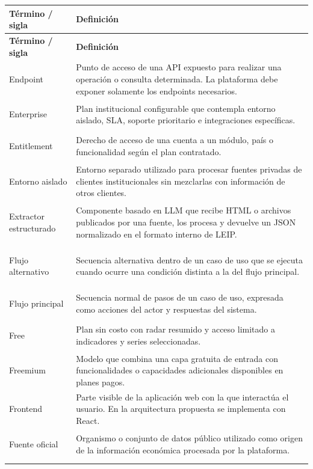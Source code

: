 \documentclass[11pt,a4paper]{article}
\makeatletter
\newcommand{\proyectoNombre}{LEIP}
\newenvironment{glosario}{%
  \renewcommand{\arraystretch}{1.18}%
  \begin{longtable}{@{}>{\raggedright\arraybackslash\bfseries}p{4.0cm} >{\raggedright\arraybackslash}p{10.7cm}@{}}
  \toprule
  \textbf{T\'ermino / sigla} & \textbf{Definici\'on} \\
  \midrule
  \endfirsthead
  \toprule
  \textbf{T\'ermino / sigla} & \textbf{Definici\'on} \\
  \midrule
  \endhead
  \bottomrule
  \endfoot
}{%
  \end{longtable}
  \renewcommand{\arraystretch}{1}%
}
\makeatother
\begin{document}
\begin{glosario}
Endpoint & Punto de acceso de una API expuesto para realizar una operaci\'on o consulta determinada. La plataforma debe exponer solamente los endpoints necesarios. \\
\addlinespace

Enterprise & Plan institucional configurable que contempla entorno aislado, SLA, soporte prioritario e integraciones espec\'ificas. \\
\addlinespace

Entitlement & Derecho de acceso de una cuenta a un m\'odulo, pa\'is o funcionalidad seg\'un el plan contratado. \\
\addlinespace

Entorno aislado & Entorno separado utilizado para procesar fuentes privadas de clientes institucionales sin mezclarlas con informaci\'on de otros clientes. \\
\addlinespace

Extractor estructurado & Componente basado en LLM que recibe HTML o archivos publicados por una fuente, los procesa y devuelve un JSON normalizado en el formato interno de \proyectoNombre{}. \\
\addlinespace

Flujo alternativo & Secuencia alternativa dentro de un caso de uso que se ejecuta cuando ocurre una condici\'on distinta a la del flujo principal. \\
\addlinespace

Flujo principal & Secuencia normal de pasos de un caso de uso, expresada como acciones del actor y respuestas del sistema. \\
\addlinespace

Free & Plan sin costo con radar resumido y acceso limitado a indicadores y series seleccionadas. \\
\addlinespace

Freemium & Modelo que combina una capa gratuita de entrada con funcionalidades o capacidades adicionales disponibles en planes pagos. \\
\addlinespace

Frontend & Parte visible de la aplicaci\'on web con la que interact\'ua el usuario. En la arquitectura propuesta se implementa con React. \\
\addlinespace

Fuente oficial & Organismo o conjunto de datos p\'ublico utilizado como origen de la informaci\'on econ\'omica procesada por la plataforma. \\
\addlinespace


\end{glosario}
\end{document}
